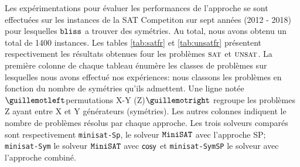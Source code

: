\begin{table}[!htbp]\footnotesize
	\centering
	\caption{Comparaison des approches sur les instances UNSAT.}
	\label{tab:unsatfr}
\end{table}

Les expérimentations pour évaluer les performances de l'approche se sont effectuées sur les instances de la SAT Competiton sur sept années 
(2012 - 2018) pour lesquelles $\texttt{bliss}$ a trouver des symétries. Au total, nous avons obtenu un total de 1400 instances. 
Les tables \ref{tab:satfr} et \ref{tab:unsatfr} présentent respectivement
les résultats obtenues four les problèmes $\textsc{sat}$ et $\textsc{unsat}$.
La première colonne de chaque tableau énumère les classes de problèmes sur lesquelles nous avons effectué nos expériences: nous classons les problèmes en fonction du nombre de symétries qu'ils admettent. Une ligne notée $\guillemotleft$permutations X-Y (Z)$\guillemotright$ regroupe les problèmes Z ayant entre X et Y générateurs (symétries). Les autres colonnes indiquent le nombre de problèmes résolus par chaque approche. Les trois solveurs comparés sont respectivement
\texttt{minisat-Sp}, le solveur $\texttt{MiniSAT}$ avec l'approche SP; \texttt{minisat-Sym} le solveur $\texttt{MiniSAT}$ avec $\textsf{cosy}$ et \texttt{minisat-SymSP} le solveur avec l'approche combiné.
 
